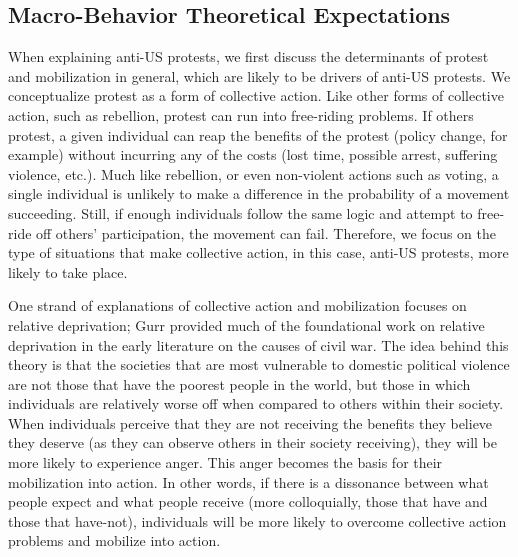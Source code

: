 		
		\subsection*{Macro-Behavior Theoretical Expectations}
		When explaining anti-US protests, we first discuss the determinants of protest and mobilization in general, which are likely to be drivers of anti-US protests.  We conceptualize protest as a form of collective action.  Like other forms of collective action, such as rebellion, protest can run into free-riding problems.\cite{Olson1965,Lohmann1993}  If others protest, a given individual can reap the benefits of the protest (policy change, for example) without incurring any of the costs (lost time, possible arrest, suffering violence, etc.).  Much like rebellion, or even non-violent actions such as voting, a single individual is unlikely to make a difference in the probability of a movement succeeding. Still, if enough individuals follow the same logic and attempt to free-ride off others' participation, the movement can fail.\cite{lichbach1993}  Therefore, we focus on the type of situations that make collective action, in this case, anti-US protests, more likely to take place.  
		
		One strand of explanations of collective action and mobilization focuses on relative deprivation; Gurr provided much of the foundational work on relative deprivation in the early literature on the causes of civil war.\cite{Gurr1968}  The idea behind this theory is that the societies that are most vulnerable to domestic political violence are not those that have the poorest people in the world, but those in which individuals are relatively worse off when compared to others within their society. When individuals perceive that they are not receiving the benefits they believe they deserve (as they can observe others in their society receiving), they will be more likely to experience anger. This anger becomes the basis for their mobilization into action.  In other words, if there is a dissonance between what people expect and what people receive (more colloquially, those that have and those that have-not), individuals will be more likely to overcome collective action problems and mobilize into action. 
		

